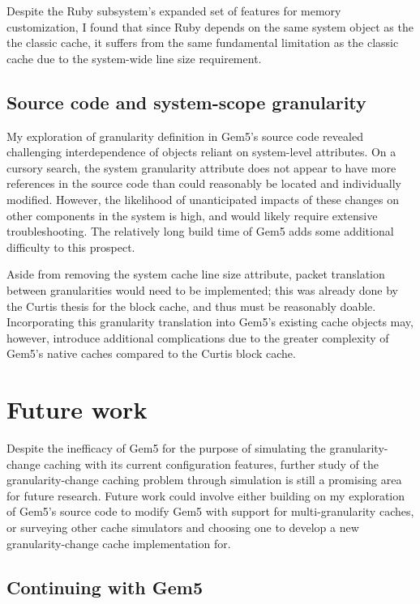 \documentclass[12pt,twoside]{reedthesis}
\begin{document}
	Despite the Ruby subsystem's expanded set of features for memory customization, I found that since Ruby depends on the same system object as the the classic cache, it suffers from the same fundamental limitation as the classic cache due to the system-wide line size requirement.

	\subsection*{Source code and system-scope granularity}

	My exploration of granularity definition in Gem5's source code revealed challenging interdependence of objects reliant on system-level attributes. On a cursory search, the system granularity attribute does not appear to have more references in the source code than could reasonably be located and individually modified. However, the likelihood of unanticipated impacts of these changes on other components in the system is high, and would likely require extensive troubleshooting. The relatively long build time of Gem5 adds some additional difficulty to this prospect.

	Aside from removing the system cache line size attribute, packet translation between granularities would need to be implemented; this was already done by the Curtis thesis for the block cache, and thus must be reasonably doable. Incorporating this granularity translation into Gem5's existing cache objects may, however, introduce additional complications due to the greater complexity of Gem5's native caches compared to the Curtis block cache.

\section{Future work}

	Despite the inefficacy of Gem5 for the purpose of simulating the granularity-change caching with its current configuration features, further study of the granularity-change caching problem through simulation is still a promising area for future research. Future work could involve either building on my exploration of Gem5's source code to modify Gem5 with support for multi-granularity caches, or surveying other cache simulators and choosing one to develop a new granularity-change cache implementation for.

	\subsection*{Continuing with Gem5}
\end{document}
